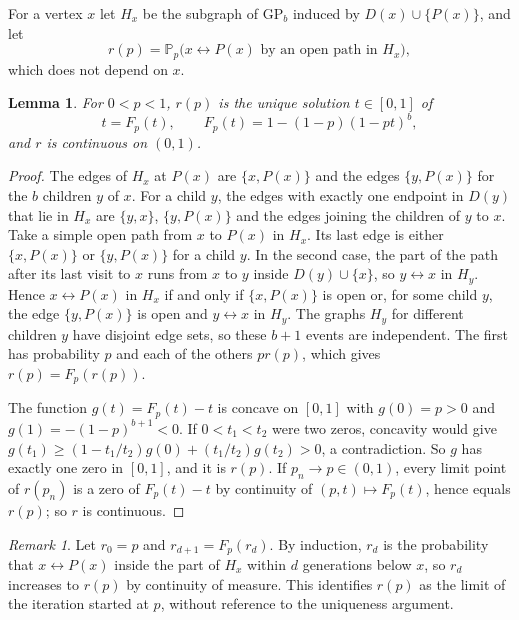\documentclass[11pt]{amsart}
\newtheorem{lemma}[theorem]{Lemma}
\theoremstyle{remark}
\newtheorem{remark}[theorem]{Remark}
\newcommand{\PP}{\mathbb{P}}
\newcommand{\GP}{\mathrm{GP}_b}
\begin{document}
For a vertex $x$ let $H_x$ be the subgraph of $\GP$ induced by $D(x)\cup\{P(x)\}$, and let
\[
r(p)=\PP_p\bigl(x\leftrightarrow P(x)\text{ by an open path in }H_x\bigr),
\]
which does not depend on $x$.

\begin{lemma}\label{lem:cone}
For $0<p<1$, $r(p)$ is the unique solution $t\in[0,1]$ of
\begin{equation}\label{eq:cone}
t=F_p(t),\qquad F_p(t)=1-(1-p)(1-pt)^b,
\end{equation}
and $r$ is continuous on $(0,1)$.
\end{lemma}

\begin{proof}
The edges of $H_x$ at $P(x)$ are $\{x,P(x)\}$ and the edges $\{y,P(x)\}$ for the $b$ children $y$ of $x$. For a child
$y$, the edges with exactly one endpoint in $D(y)$ that lie in $H_x$ are $\{y,x\}$, $\{y,P(x)\}$ and the edges joining
the children of $y$ to $x$. Take a simple open path from $x$ to $P(x)$ in $H_x$. Its last edge is either $\{x,P(x)\}$ or
$\{y,P(x)\}$ for a child $y$. In the second case, the part of the path after its last visit to $x$ runs from $x$ to $y$
inside $D(y)\cup\{x\}$, so $y\leftrightarrow x$ in $H_y$. Hence $x\leftrightarrow P(x)$ in $H_x$ if and only if
$\{x,P(x)\}$ is open or, for some child $y$, the edge $\{y,P(x)\}$ is open and $y\leftrightarrow x$ in $H_y$. The graphs
$H_y$ for different children $y$ have disjoint edge sets, so these $b+1$ events are independent. The first has
probability $p$ and each of the others $pr(p)$, which gives $r(p)=F_p(r(p))$.

The function $g(t)=F_p(t)-t$ is concave on $[0,1]$ with $g(0)=p>0$ and $g(1)=-(1-p)^{b+1}<0$. If $0<t_1<t_2$ were
two zeros, concavity would give $g(t_1)\ge (1-t_1/t_2)g(0)+(t_1/t_2)g(t_2)>0$, a contradiction. So $g$ has exactly one
zero in $[0,1]$, and it is $r(p)$. If $p_n\to p\in(0,1)$, every limit point of $r(p_n)$ is a zero of $F_p(t)-t$ by
continuity of $(p,t)\mapsto F_p(t)$, hence equals $r(p)$; so $r$ is continuous.
\end{proof}

\begin{remark}\label{rem:iteration}
Let $r_0=p$ and $r_{d+1}=F_p(r_d)$. By induction, $r_d$ is the probability that $x\leftrightarrow P(x)$ inside the part
of $H_x$ within $d$ generations below $x$, so $r_d$ increases to $r(p)$ by continuity of measure. This identifies $r(p)$
as the limit of the iteration started at $p$, without reference to the uniqueness argument.
\end{remark}
\end{document}
